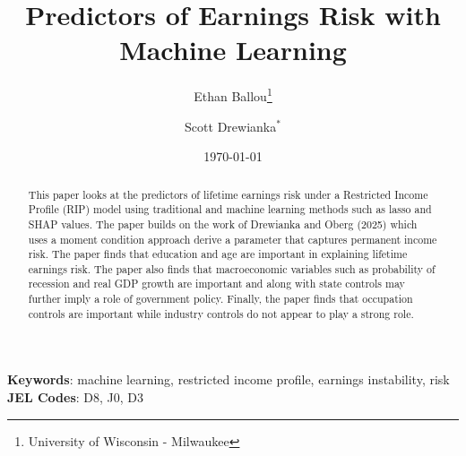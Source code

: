 \documentclass[12pt]{article}
\title{Predictors of Earnings Risk with Machine Learning}
\author{Ethan Ballou\thanks{University of Wisconsin - Milwaukee} \and Scott Drewianka$^{*}$}
\date{\today}
\begin{document}
\maketitle
\thispagestyle{empty}



\begin{abstract}
\begin{singlespace}


\noindent This paper looks at the predictors of lifetime earnings risk under a Restricted Income Profile (RIP) model using traditional and machine learning methods such as lasso and SHAP values. The paper builds on the work of Drewianka and Oberg (2025) which uses a moment condition approach derive a parameter that captures permanent income risk. The paper finds that education and age are important in explaining lifetime earnings risk. The paper also finds that macroeconomic variables such as probability of recession and real GDP growth are important and along with state controls may further imply a role of government policy. Finally, the paper finds that occupation controls are important while industry controls do not appear to play a strong role. 

\end{singlespace}
\end{abstract}


\vspace{1cm}

\noindent

\textbf{Keywords}: machine learning, restricted income profile, earnings instability, risk \\
\indent \textbf{JEL Codes}: D8, J0, D3\\





\clearpage
\setcounter{page}{1}
\end{document}
